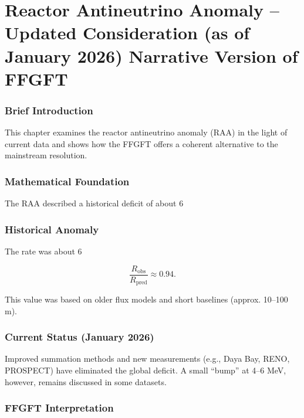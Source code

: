 \chapter{Reactor Antineutrino Anomaly – Updated Consideration (as of January 2026)  Narrative Version of FFGFT}


	
	\subsection*{Brief Introduction}
	
	This chapter examines the reactor antineutrino anomaly (RAA) in the light of current data and shows how the FFGFT offers a coherent alternative to the mainstream resolution.
	
	\subsection*{Mathematical Foundation}
	
	The RAA described a historical deficit of about 6%
	
	\subsection*{Historical Anomaly}
	
	The rate was about 6%
	
	\begin{equation}
		\frac{R_{\text{obs}}}{R_{\text{pred}}} \approx 0.94.
	\end{equation}
	
	This value was based on older flux models and short baselines (approx. 10–100 m).
	
	\subsection*{Current Status (January 2026)}
	
	Improved summation methods and new measurements (e.g., Daya Bay, RENO, PROSPECT) have eliminated the global deficit. A small “bump” at 4–6 MeV, however, remains discussed in some datasets.
	
	\subsection*{FFGFT Interpretation}
	
